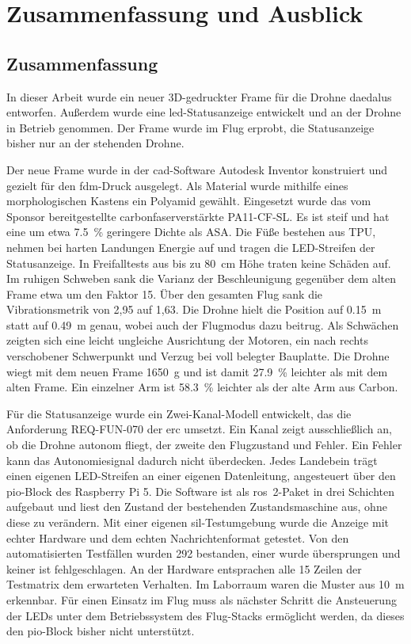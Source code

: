 \chapter{Zusammenfassung und Ausblick}
\label{ch:Zusammenfassung}

\section{Zusammenfassung}
\label{sec:Zusammenfassung}

In dieser Arbeit wurde ein neuer 3D-gedruckter Frame für die Drohne \gls{daedalus} entworfen. Außerdem wurde eine \gls{led}-Statusanzeige entwickelt und an der Drohne in Betrieb genommen. Der Frame wurde im Flug erprobt, die Statusanzeige bisher nur an der stehenden Drohne.

Der neue Frame wurde in der \gls{cad}-Software Autodesk Inventor konstruiert und gezielt für den \gls{fdm}-Druck ausgelegt. Als Material wurde mithilfe eines morphologischen Kastens ein Polyamid gewählt. Eingesetzt wurde das vom Sponsor bereitgestellte carbonfaserverstärkte PA11-CF-SL. Es ist steif und hat eine um etwa \SI{7,5}{\percent} geringere Dichte als ASA. Die Füße bestehen aus TPU, nehmen bei harten Landungen Energie auf und tragen die LED-Streifen der Statusanzeige. In Freifalltests aus bis zu \SI{80}{\centi\metre} Höhe traten keine Schäden auf. Im ruhigen Schweben sank die Varianz der Beschleunigung gegenüber dem alten Frame etwa um den Faktor 15. Über den gesamten Flug sank die Vibrationsmetrik von 2,95 auf 1,63. Die Drohne hielt die Position auf \SI{0,15}{\metre} statt auf \SI{0,49}{\metre} genau, wobei auch der Flugmodus dazu beitrug. Als Schwächen zeigten sich eine leicht ungleiche Ausrichtung der Motoren, ein nach rechts verschobener Schwerpunkt und Verzug bei voll belegter Bauplatte. Die Drohne wiegt mit dem neuen Frame \SI{1650}{\gram} und ist damit \SI{27,9}{\percent} leichter als mit dem alten Frame. Ein einzelner Arm ist \SI{58,3}{\percent} leichter als der alte Arm aus Carbon.

Für die Statusanzeige wurde ein Zwei-Kanal-Modell entwickelt, das die Anforderung REQ-FUN-070 der \gls{erc} umsetzt. Ein Kanal zeigt ausschließlich an, ob die Drohne autonom fliegt, der zweite den Flugzustand und Fehler. Ein Fehler kann das Autonomiesignal dadurch nicht überdecken. Jedes Landebein trägt einen eigenen LED-Streifen an einer eigenen Datenleitung, angesteuert über den \gls{pio}-Block des Raspberry Pi 5. Die Software ist als \gls{ros}~2-Paket in drei Schichten aufgebaut und liest den Zustand der bestehenden Zustandsmaschine aus, ohne diese zu verändern. Mit einer eigenen \gls{sil}-Testumgebung wurde die Anzeige mit echter Hardware und dem echten Nachrichtenformat getestet. Von den automatisierten Testfällen wurden 292 bestanden, einer wurde übersprungen und keiner ist fehlgeschlagen. An der Hardware entsprachen alle 15 Zeilen der Testmatrix dem erwarteten Verhalten. Im Laborraum waren die Muster aus \SI{10}{\metre} erkennbar. Für einen Einsatz im Flug muss als nächster Schritt die Ansteuerung der LEDs unter dem Betriebssystem des Flug-Stacks ermöglicht werden, da dieses den \gls{pio}-Block bisher nicht unterstützt.

